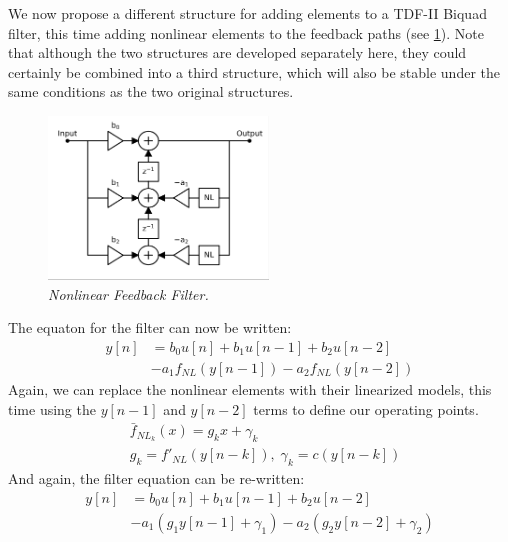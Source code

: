 \documentclass[twoside,a4paper]{article}
\begin{document}
%
We now propose a different structure for adding elements to a TDF-II
Biquad filter, this time adding nonlinear elements to the feedback
paths (see \cref{NL2-TDF-II}). Note that although the two structures are
developed separately here, they could certainly be combined into a third
structure, which will also be stable under the same conditions as the two
original structures.
%
\begin{figure}[ht]
    \center
    \includegraphics[width=2.3in]{../../NonlinearFeedback/Pics/NL2-TDF-II-White.png}
    \caption{\label{NL2-TDF-II}{\it Nonlinear Feedback Filter.}}
\end{figure}
%
The equaton for the filter can now be written:
%
\begin{equation}
    \begin{split}
        y[n] &= b_0 u[n] + b_1 u[n-1] + b_2 u[n-2] \\
             &- a_1 f_{NL}(y[n-1]) - a_2 f_{NL}(y[n-2])
    \end{split}
        \label{eq:nlbq2}
\end{equation}
%
Again, we can replace the nonlinear elements with their linearized
models, this time using the $y[n-1]$ and $y[n-2]$ terms to define our
operating points.
%
\begin{equation}
    \begin{split}
        & \bar{f}_{NL_k}(x) = g_k x + \gamma_k \\
        & g_k = f'_{NL}(y[n-k]), \; \gamma_k = c(y[n-k])
    \end{split}
        \label{eq:gs2}
\end{equation}
%
And again, the filter equation can be re-written:
%
\begin{equation}
    \begin{split}
        y[n] & = b_0 u[n] + b_1 u[n-1] + b_2 u[n-2] \\
        & - a_1 (g_1 y[n-1] + \gamma_1)
        - a_2 (g_2 y[n-2] + \gamma_2)
    \end{split}
        \label{eq:nlbq2_rewrite}
\end{equation}
%
\end{document}
